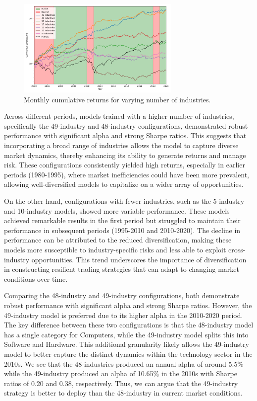 \documentclass{article}
\begin{document}
\begin{figure}[H]
    \centering
    \includegraphics[width=0.7\textwidth]{2020_plot3_num_industries_comparison.png}
    \caption{Monthly cumulative returns for varying number of industries.}
    \label{fig:industry_comp}
\end{figure}

Across different periods, models trained with a higher number of industries, specifically the 49-industry and 48-industry configurations, demonstrated robust performance with significant alpha and strong Sharpe ratios. This suggests that incorporating a broad range of industries allows the model to capture diverse market dynamics, thereby enhancing its ability to generate returns and manage risk. These configurations consistently yielded high returns, especially in earlier periods (1980-1995), where market inefficiencies could have been more prevalent, allowing well-diversified models to capitalize on a wider array of opportunities.

On the other hand, configurations with fewer industries, such as the 5-industry and 10-industry models, showed more variable performance. These models achieved remarkable results in the first period but struggled to maintain their performance in subsequent periods (1995-2010 and 2010-2020). The decline in performance can be attributed to the reduced diversification, making these models more susceptible to industry-specific risks and less able to exploit cross-industry opportunities. This trend underscores the importance of diversification in constructing resilient trading strategies that can adapt to changing market conditions over time.

Comparing the 48-industry and 49-industry configurations, both demonstrate robust performance with significant alpha and strong Sharpe ratios. However, the 49-industry model is preferred due to its higher alpha in the 2010-2020 period. The key difference between these two configurations is that the 48-industry model has a single category for Computers, while the 49-industry model splits this into Software and Hardware. This additional granularity likely allows the 49-industry model to better capture the distinct dynamics within the technology sector in the 2010s. We see that the 48-industries produced an annual alpha of around 5.5\% while the 49-industry produced an alpha of 10.65\% in the 2010s with Sharpe ratios of 0.20 and 0.38, respectively. Thus, we can argue that the 49-industry strategy is better to deploy than the 48-industry in current market conditions.
\end{document}

